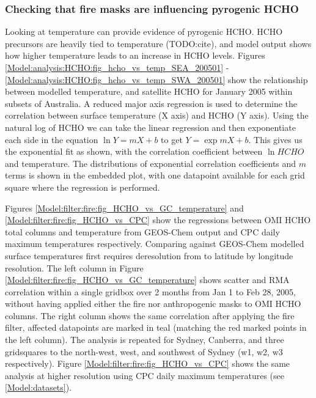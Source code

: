   
    \subsubsection{Checking that fire masks are influencing pyrogenic HCHO}
      
      
      Looking at temperature can provide evidence of pyrogenic HCHO.
      HCHO precursors are heavily tied to temperature (TODO:cite), and model output shows how higher temperature leads to an increase in HCHO levels.
      Figures \ref{Model:analysis:HCHO:fig_hcho_vs_temp_SEA_200501} - \ref{Model:analysis:HCHO:fig_hcho_vs_temp_SWA_200501} show the relationship between modelled temperature, and satellite HCHO for January 2005 within subsets of Australia.
      A reduced major axis regression is used to determine the correlation between surface temperature (X axis) and HCHO (Y axis).
      Using the natural log of HCHO we can take the linear regression and then exponentiate each side in the equation $\ln{Y} = m{X}+b$ to get ${Y} = \exp{m{X}+b}$. 
      This gives us the exponential fit as shown, with the correlation coefficient between $\ln{HCHO}$ and temperature.
      The distributions of exponential correlation coefficients and $m$ terms is shown in the embedded plot, with one datapoint available for each grid square where the regression is performed.
      
      Figures \ref{Model:filter:fire:fig_HCHO_vs_GC_temperature} and \ref{Model:filter:fire:fig_HCHO_vs_CPC} show the regressions between OMI HCHO total columns and temperature from GEOS-Chem output and CPC daily maximum temperatures respectively.
      Comparing against GEOS-Chem modelled surface temperatures first requires deresolution from \highhr to \lowhr latitude by longitude resolution.
      The left column in Figure \ref{Model:filter:fire:fig_HCHO_vs_GC_temperature} shows scatter and RMA correlation within a single gridbox over 2 months from Jan 1 to Feb 28, 2005, without having applied either the fire nor anthropogenic masks to OMI HCHO columns. 
      The right column shows the same correlation after applying the fire filter, affected datapoints are marked in teal (matching the red marked points in the left column).
      The analysis is repeated for Sydney, Canberra, and three gridsquares to the north-west, west, and southwest of Sydney (w1, w2, w3 respectively).
      Figure \ref{Model:filter:fire:fig_HCHO_vs_CPC} shows the same analysis at higher resolution using CPC daily maximum temperatures (see \ref{Model:datasets}).
      
